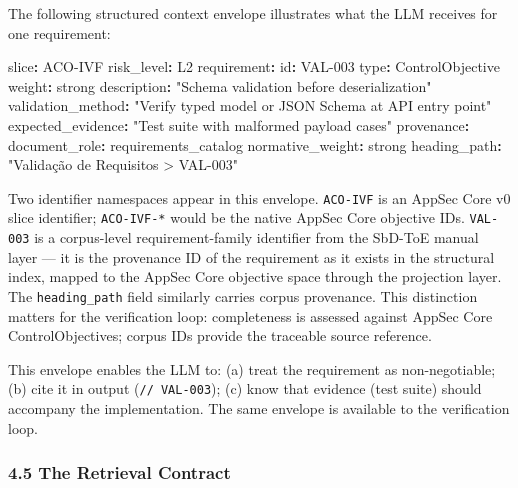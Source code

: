 \documentclass[
]{article}
\newenvironment{Shaded}{}{}
\newcommand{\AttributeTok}[1]{\textcolor[rgb]{0.49,0.56,0.16}{#1}}
\newcommand{\FunctionTok}[1]{\textcolor[rgb]{0.02,0.16,0.49}{#1}}
\newcommand{\KeywordTok}[1]{\textcolor[rgb]{0.00,0.44,0.13}{\textbf{#1}}}
\newcommand{\StringTok}[1]{\textcolor[rgb]{0.25,0.44,0.63}{#1}}
\begin{document}
The following structured context envelope illustrates what the LLM
receives for one requirement:

\begin{Shaded}
\begin{Highlighting}[]
\FunctionTok{slice}\KeywordTok{:}\AttributeTok{ ACO{-}IVF}
\FunctionTok{risk\_level}\KeywordTok{:}\AttributeTok{ L2}
\FunctionTok{requirement}\KeywordTok{:}
\AttributeTok{  }\FunctionTok{id}\KeywordTok{:}\AttributeTok{ VAL{-}003}
\AttributeTok{  }\FunctionTok{type}\KeywordTok{:}\AttributeTok{ ControlObjective}
\AttributeTok{  }\FunctionTok{weight}\KeywordTok{:}\AttributeTok{ strong}
\AttributeTok{  }\FunctionTok{description}\KeywordTok{:}\AttributeTok{ }\StringTok{"Schema validation before deserialization"}
\AttributeTok{  }\FunctionTok{validation\_method}\KeywordTok{:}\AttributeTok{ }\StringTok{"Verify typed model or JSON Schema at API entry point"}
\AttributeTok{  }\FunctionTok{expected\_evidence}\KeywordTok{:}\AttributeTok{ }\StringTok{"Test suite with malformed payload cases"}
\AttributeTok{  }\FunctionTok{provenance}\KeywordTok{:}
\AttributeTok{    }\FunctionTok{document\_role}\KeywordTok{:}\AttributeTok{ requirements\_catalog}
\AttributeTok{    }\FunctionTok{normative\_weight}\KeywordTok{:}\AttributeTok{ strong}
\AttributeTok{    }\FunctionTok{heading\_path}\KeywordTok{:}\AttributeTok{ }\StringTok{"Validação de Requisitos \textgreater{} VAL{-}003"}
\end{Highlighting}
\end{Shaded}

Two identifier namespaces appear in this envelope. \texttt{ACO-IVF} is
an AppSec Core v0 slice identifier; \texttt{ACO-IVF-*} would be the
native AppSec Core objective IDs. \texttt{VAL-003} is a corpus-level
requirement-family identifier from the SbD-ToE manual layer --- it is
the provenance ID of the requirement as it exists in the structural
index, mapped to the AppSec Core objective space through the projection
layer. The \texttt{heading\_path} field similarly carries corpus
provenance. This distinction matters for the verification loop:
completeness is assessed against AppSec Core ControlObjectives; corpus
IDs provide the traceable source reference.

This envelope enables the LLM to: (a) treat the requirement as
non-negotiable; (b) cite it in output (\texttt{//\ VAL-003}); (c) know
that evidence (test suite) should accompany the implementation. The same
envelope is available to the verification loop.

\subsubsection{4.5 The Retrieval Contract}\label{the-retrieval-contract}
\end{document}
